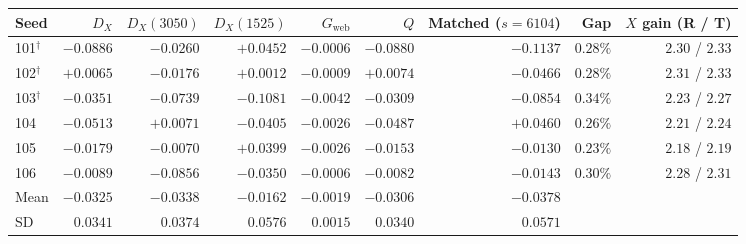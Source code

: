 \begin{tabular}{@{}lrrrrrrrr@{}}
\toprule
Seed & $D_X$ & $D_X(3050)$ & $D_X(1525)$ & $G_{\text{web}}$ & $Q$ & Matched ($s{=}6104$) & Gap & $X$ gain (R / T) \\
\midrule
101$^\dagger$ & $-0.0886$ & $-0.0260$ & ${+}0.0452$ & $-0.0006$ & $-0.0880$ & $-0.1137$ & $0.28\%$ & $2.30$ / $2.33$ \\
102$^\dagger$ & ${+}0.0065$ & $-0.0176$ & ${+}0.0012$ & $-0.0009$ & ${+}0.0074$ & $-0.0466$ & $0.28\%$ & $2.31$ / $2.33$ \\
103$^\dagger$ & $-0.0351$ & $-0.0739$ & $-0.1081$ & $-0.0042$ & $-0.0309$ & $-0.0854$ & $0.34\%$ & $2.23$ / $2.27$ \\
104 & $-0.0513$ & ${+}0.0071$ & $-0.0405$ & $-0.0026$ & $-0.0487$ & ${+}0.0460$ & $0.26\%$ & $2.21$ / $2.24$ \\
105 & $-0.0179$ & $-0.0070$ & ${+}0.0399$ & $-0.0026$ & $-0.0153$ & $-0.0130$ & $0.23\%$ & $2.18$ / $2.19$ \\
106 & $-0.0089$ & $-0.0856$ & $-0.0350$ & $-0.0006$ & $-0.0082$ & $-0.0143$ & $0.30\%$ & $2.28$ / $2.31$ \\
\midrule
Mean & $-0.0325$ & $-0.0338$ & $-0.0162$ & $-0.0019$ & $-0.0306$ & $-0.0378$ & & \\
SD & $0.0341$ & $0.0374$ & $0.0576$ & $0.0015$ & $0.0340$ & $0.0571$ & & \\
\bottomrule
\end{tabular}
